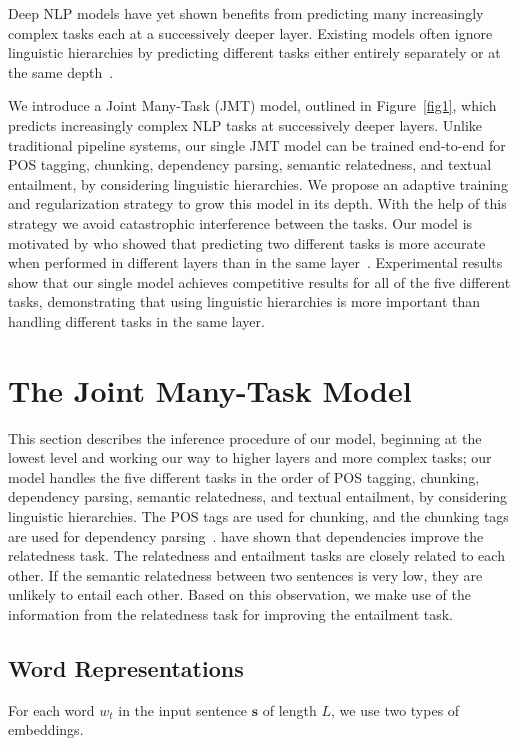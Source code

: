 \documentclass[11pt,a4paper]{article}
\begin{document}
Deep NLP models have yet shown benefits from predicting many increasingly complex tasks each at a successively deeper layer.
Existing models often ignore linguistic hierarchies by predicting different tasks either entirely separately or at the same depth~\citep{collobert2011senna}.

We introduce a Joint Many-Task (JMT) model, outlined in Figure~\ref{fig1}, which predicts increasingly complex NLP tasks at successively deeper layers.
Unlike traditional pipeline systems, our single JMT model can be trained end-to-end for POS tagging, chunking, dependency parsing, semantic relatedness, and textual entailment, by considering linguistic hierarchies.
We propose an adaptive training and regularization strategy to grow this model in its depth. 
With the help of this strategy we avoid catastrophic interference between the tasks.
Our model is motivated by \citet{sogaard2016} who showed that predicting two different tasks is more accurate when performed in different layers than in the same layer~\citep{collobert2011senna}.
Experimental results show that our single model achieves competitive results for all of the five different tasks, demonstrating that using linguistic hierarchies is more important than handling different tasks in the same layer.


\section{The Joint Many-Task Model}
This section describes the inference procedure of our model, beginning at the lowest level and working our way to higher layers and more complex tasks; our model handles the five different tasks in the order of POS tagging, chunking, dependency parsing, semantic relatedness, and textual entailment, by considering linguistic hierarchies.
The POS tags are used for chunking, and the chunking tags are used for dependency parsing~\citep{Attardi2008}.
\citet{tai2015treelstm} have shown that dependencies improve the relatedness task.
The relatedness and entailment tasks are closely related to each other.
If the semantic relatedness between two sentences is very low, they are unlikely to entail each other.
Based on this observation, we make use of the information from the relatedness task for improving the entailment task.

\subsection{Word Representations}
\label{subsec:wordrep}
For each word $w_t$ in the input sentence $\bm{s}$ of length $L$, we use two types of embeddings.
\end{document}
